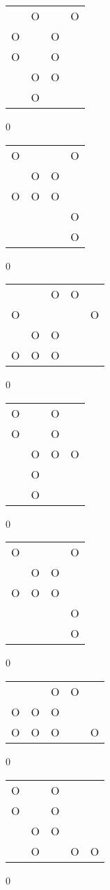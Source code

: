 \begin{tabular}{|m{0.2cm}m{0.2cm}m{0.2cm}m{0.2cm}|}\hline
 &O& &O\\
O& &O& \\
O& &O& \\
 &O&O& \\
 &O& & \\
\hline\end{tabular}0
\begin{tabular}{|m{0.2cm}m{0.2cm}m{0.2cm}m{0.2cm}|}\hline
O& & &O\\
 &O&O& \\
O&O&O& \\
 & & &O\\
 & & &O\\
\hline\end{tabular}0
\begin{tabular}{|m{0.2cm}m{0.2cm}m{0.2cm}m{0.2cm}m{0.2cm}|}\hline
 & &O&O& \\
O& & & &O\\
 &O&O& & \\
O&O&O& & \\
\hline\end{tabular}0
\begin{tabular}{|m{0.2cm}m{0.2cm}m{0.2cm}m{0.2cm}|}\hline
O& &O& \\
O& &O& \\
 &O&O&O\\
 &O& & \\
 &O& & \\
\hline\end{tabular}0
\begin{tabular}{|m{0.2cm}m{0.2cm}m{0.2cm}m{0.2cm}|}\hline
O& & &O\\
 &O&O& \\
O&O&O& \\
 & & &O\\
 & & &O\\
\hline\end{tabular}0
\begin{tabular}{|m{0.2cm}m{0.2cm}m{0.2cm}m{0.2cm}m{0.2cm}|}\hline
 & &O&O& \\
O&O&O& & \\
O&O&O& &O\\
\hline\end{tabular}0
\begin{tabular}{|m{0.2cm}m{0.2cm}m{0.2cm}m{0.2cm}m{0.2cm}|}\hline
O& &O& & \\
O& &O& & \\
 &O&O& & \\
 &O& &O&O\\
\hline\end{tabular}0
